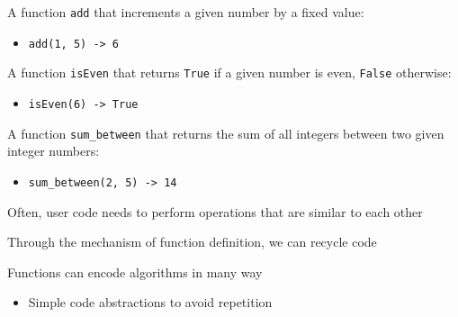 \documentclass{beamer}
\begin{document}
\begin{comment}
	\begin{lstlisting}
def distance(n,m):
  if n >= m:
    return 0
  else:
    return sum_between(n + 1, m) + 1
	
print(distance(2, 4)))
	\end{lstlisting}
	
	\pause
	
	\begin{statetable}
		{|c|c|}{PC & distance }{7 & \red{2} }
	\end{statetable} \ \\
\end{frame}

\end{comment}

\begin{slide}{
\item A function \texttt{add} that increments a given number by a fixed value:
\begin{itemize}
\item \texttt{add(1, 5) -> 6}
\end{itemize}
\item A function \texttt{isEven} that returns \texttt{True} if a given number is even, \texttt{False} otherwise:
\begin{itemize}
\item \texttt{isEven(6) -> True}
\end{itemize}
\item A function \texttt{sum\_between} that returns the sum of all integers between two given integer numbers:
\begin{itemize}
\item \texttt{sum\_between(2, 5) -> 14}
\end{itemize}
}\end{slide}

\begin{slide}{
\item Often, user code needs to perform operations that are similar to each other
\item Through the mechanism of function definition, we can recycle code
\item Functions can encode algorithms in many way
\begin{itemize}
\item Simple code abstractions to avoid repetition
\end{itemize}
}\end{slide}

\begin{thankyou}
\end{thankyou}
\end{document}
